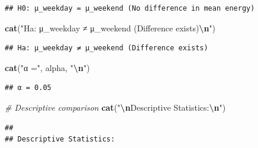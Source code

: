 \documentclass[
  12pt,
]{article}
\newenvironment{Shaded}{\begin{snugshade}}{\end{snugshade}}
\newcommand{\AttributeTok}[1]{\textcolor[rgb]{0.13,0.29,0.53}{#1}}
\newcommand{\CommentTok}[1]{\textcolor[rgb]{0.56,0.35,0.01}{\textit{#1}}}
\newcommand{\DecValTok}[1]{\textcolor[rgb]{0.00,0.00,0.81}{#1}}
\newcommand{\FunctionTok}[1]{\textcolor[rgb]{0.13,0.29,0.53}{\textbf{#1}}}
\newcommand{\NormalTok}[1]{#1}
\newcommand{\SpecialCharTok}[1]{\textcolor[rgb]{0.81,0.36,0.00}{\textbf{#1}}}
\newcommand{\StringTok}[1]{\textcolor[rgb]{0.31,0.60,0.02}{#1}}
\begin{document}
\begin{verbatim}
## H0: μ_weekday = μ_weekend (No difference in mean energy)
\end{verbatim}

\begin{Shaded}
\begin{Highlighting}[]
\FunctionTok{cat}\NormalTok{(}\StringTok{"Ha: μ\_weekday ≠ μ\_weekend (Difference exists)}\SpecialCharTok{\textbackslash{}n}\StringTok{"}\NormalTok{)}
\end{Highlighting}
\end{Shaded}

\begin{verbatim}
## Ha: μ_weekday ≠ μ_weekend (Difference exists)
\end{verbatim}

\begin{Shaded}
\begin{Highlighting}[]
\FunctionTok{cat}\NormalTok{(}\StringTok{"α ="}\NormalTok{, alpha, }\StringTok{"}\SpecialCharTok{\textbackslash{}n}\StringTok{"}\NormalTok{)}
\end{Highlighting}
\end{Shaded}

\begin{verbatim}
## α = 0.05
\end{verbatim}

\begin{Shaded}
\begin{Highlighting}[]
\CommentTok{\# Descriptive comparison}
\FunctionTok{cat}\NormalTok{(}\StringTok{"}\SpecialCharTok{\textbackslash{}n}\StringTok{Descriptive Statistics:}\SpecialCharTok{\textbackslash{}n}\StringTok{"}\NormalTok{)}
\end{Highlighting}
\end{Shaded}

\begin{verbatim}
## 
## Descriptive Statistics:
\end{verbatim}

\begin{Shaded}
\end{Shaded}
\end{document}
